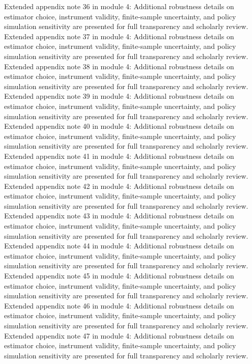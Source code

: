\documentclass[preprint,12pt]{elsarticle}
\begin{document}
Extended appendix note 36 in module 4: Additional robustness details on estimator choice, instrument validity, finite-sample uncertainty, and policy simulation sensitivity are presented for full transparency and scholarly review.
Extended appendix note 37 in module 4: Additional robustness details on estimator choice, instrument validity, finite-sample uncertainty, and policy simulation sensitivity are presented for full transparency and scholarly review.
Extended appendix note 38 in module 4: Additional robustness details on estimator choice, instrument validity, finite-sample uncertainty, and policy simulation sensitivity are presented for full transparency and scholarly review.
Extended appendix note 39 in module 4: Additional robustness details on estimator choice, instrument validity, finite-sample uncertainty, and policy simulation sensitivity are presented for full transparency and scholarly review.
Extended appendix note 40 in module 4: Additional robustness details on estimator choice, instrument validity, finite-sample uncertainty, and policy simulation sensitivity are presented for full transparency and scholarly review.
Extended appendix note 41 in module 4: Additional robustness details on estimator choice, instrument validity, finite-sample uncertainty, and policy simulation sensitivity are presented for full transparency and scholarly review.
Extended appendix note 42 in module 4: Additional robustness details on estimator choice, instrument validity, finite-sample uncertainty, and policy simulation sensitivity are presented for full transparency and scholarly review.
Extended appendix note 43 in module 4: Additional robustness details on estimator choice, instrument validity, finite-sample uncertainty, and policy simulation sensitivity are presented for full transparency and scholarly review.
Extended appendix note 44 in module 4: Additional robustness details on estimator choice, instrument validity, finite-sample uncertainty, and policy simulation sensitivity are presented for full transparency and scholarly review.
Extended appendix note 45 in module 4: Additional robustness details on estimator choice, instrument validity, finite-sample uncertainty, and policy simulation sensitivity are presented for full transparency and scholarly review.
Extended appendix note 46 in module 4: Additional robustness details on estimator choice, instrument validity, finite-sample uncertainty, and policy simulation sensitivity are presented for full transparency and scholarly review.
Extended appendix note 47 in module 4: Additional robustness details on estimator choice, instrument validity, finite-sample uncertainty, and policy simulation sensitivity are presented for full transparency and scholarly review.
\end{document}
